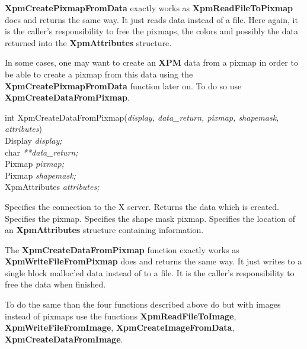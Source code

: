 {\bf XpmCreatePixmapFromData} exactly works as {\bf
Xpm\-Read\-File\-To\-Pixmap} does and returns the same way. It just reads data
instead of a file. Here again, it is the caller's responsibility to free the
pixmaps, the colors and possibly the data returned into the {\bf
XpmAttributes} structure.

\vspace{.5cm}
In some cases, one may want to create an {\bf XPM} data from a pixmap in order
to be able to create a pixmap from this data using the {\bf
XpmCreatePixmapFromData} function later on. To do so use {\bf
XpmCreateDataFromPixmap}.

\begin{flushleft}

int XpmCreateDataFromPixmap({\it display, data\_return, pixmap, shapemask,\\
\hspace{3cm}attributes})\\

\hspace{1cm}Display {\it *display;}\\
\hspace{1cm}char {\it ***data\_return;}\\
\hspace{1cm}Pixmap {\it pixmap;}\\
\hspace{1cm}Pixmap {\it shapemask;}\\
\hspace{1cm}XpmAttributes {\it *attributes;}

\end{flushleft}

\begin{description}

 Specifies the connection to the X server.
 Returns the data which is created.
 Specifies the pixmap.
 Specifies the shape mask pixmap.
 Specifies the location of an {\bf XpmAttributes} structure
containing information.

\end{description} 

The {\bf XpmCreateDataFromPixmap} function exactly works as {\bf
Xpm\-Write\-File\-From\-Pixmap} does and returns the same way. It just writes
to a single block malloc'ed data instead of to a file. It is the caller's
responsibility to free the data when finished.

\vspace{.5cm}
To do the same than the four functions described above do but with images
instead of pixmaps use the functions {\bf XpmReadFileToImage}, {\bf
XpmWriteFileFromImage}, {\bf XpmCreateImageFromData}, {\bf
XpmCreateDataFromImage}.

